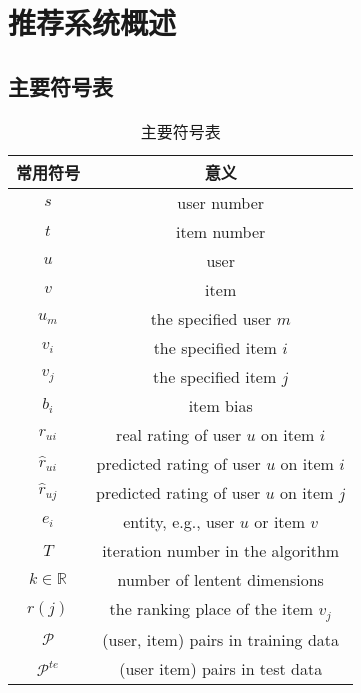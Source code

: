 \section{推荐系统概述}

\subsection{主要符号表}

\begin{table}[htbp]%
	\setlength\tabcolsep{2pt}
	\renewcommand\arraystretch{1.3}%
	\caption{主要符号表}
	\label{tab1}
	\begin{center}
		
		\begin{tabular}{cc}
			
			\Xhline{1.2pt}
			常用符号                    & 意义\\
			\hline
			$s$                         & user number \\
			$t$                         & item number \\
			$u$                         & user \\
			$v$                         & item \\
			$u_m$                       & the specified user $m$\\
			$v_i$                       & the specified item $i$\\
			$v_j$                       & the specified item $j$ \\
			$b_i$                       & item bias \\
			${r}_{ui}$                  & real rating of user $u$ on item $i$\\
			$\hat{r}_{ui}$              & predicted rating of user $u$ on item $i$\\
			$\hat{r}_{uj}$              & predicted rating of user $u$ on item $j$\\
			$e_i$                       & entity, e.g., user $u$ or item $v$\\ 
			$T$                         & iteration number in the algorithm\\
			$k \in \mathbb{R}$          & number of lentent dimensions \\
			$r\left(j\right)$           & the ranking place of the item $v_j$\\
			$\mathcal{P}$               & (user, item) pairs in training data \\
			$\mathcal{P}^{te}$          & (user item) pairs in test data\\ 

\end{tabular}
\end{center}
\end{table}
